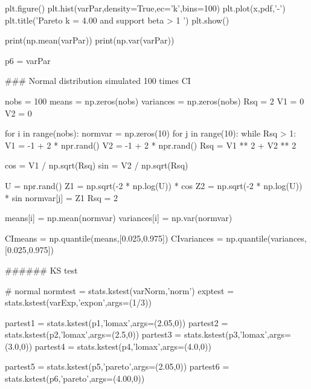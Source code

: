 \begin{python}
plt.figure()
plt.hist(varPar,density=True,ec='k',bins=100)
plt.plot(x,pdf,'-')
plt.title('Pareto k = 4.00 and support beta > 1 ')
plt.show()

print(np.mean(varPar))
print(np.var(varPar))

p6 = varPar



### Normal distribution simulated 100 times CI

nobs = 100
means = np.zeros(nobs)
variances = np.zeros(nobs)
Rsq = 2
V1 = 0
V2 = 0

for i in range(nobs):
    normvar = np.zeros(10)
    for j in range(10):
        while Rsq > 1:
            V1 = -1 + 2 * npr.rand()
            V2 = -1 + 2 * npr.rand()
            Rsq = V1 ** 2 + V2 ** 2

        cos = V1 / np.sqrt(Rsq)
        sin = V2 / np.sqrt(Rsq)

        U = npr.rand()
        Z1 = np.sqrt(-2 * np.log(U)) * cos
        Z2 = np.sqrt(-2 * np.log(U)) * sin
        normvar[j] = Z1
        Rsq = 2


    means[i] = np.mean(normvar)
    variances[i] = np.var(normvar)

CImeans = np.quantile(means,[0.025,0.975])
CIvariances = np.quantile(variances,[0.025,0.975])


###### KS test

# normal
normtest = stats.kstest(varNorm,'norm')
exptest = stats.kstest(varExp,'expon',args=(1/3))


partest1 = stats.kstest(p1,'lomax',args=(2.05,0))
partest2 = stats.kstest(p2,'lomax',args=(2.5,0))
partest3 = stats.kstest(p3,'lomax',args=(3.0,0))
partest4 = stats.kstest(p4,'lomax',args=(4.0,0))


partest5 = stats.kstest(p5,'pareto',args=(2.05,0))
partest6 = stats.kstest(p6,'pareto',args=(4.00,0))
\end{python}


